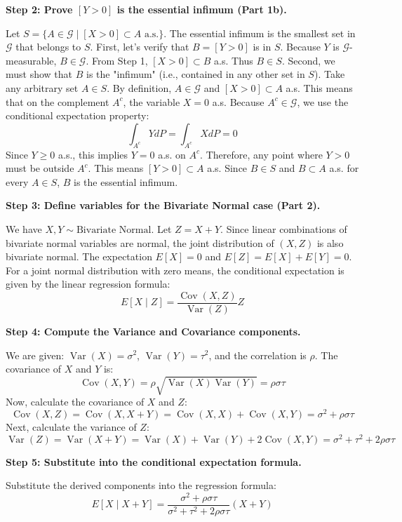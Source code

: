 \begin{solution}
\textbf{Step 2: Prove $[Y > 0]$ is the essential infimum (Part 1b).}

Let $S = \{ A \in \mathcal{G} \mid [X > 0] \subset A \text{ a.s.} \}$. The essential infimum is the smallest set in $\mathcal{G}$ that belongs to $S$.
First, let's verify that $B = [Y > 0]$ is in $S$. Because $Y$ is $\mathcal{G}$-measurable, $B \in \mathcal{G}$. From Step 1, $[X > 0] \subset B$ a.s. Thus $B \in S$.
Second, we must show that $B$ is the "infimum" (i.e., contained in any other set in $S$).
Take any arbitrary set $A \in S$. By definition, $A \in \mathcal{G}$ and $[X > 0] \subset A$ a.s.
This means that on the complement $A^c$, the variable $X = 0$ a.s.
Because $A^c \in \mathcal{G}$, we use the conditional expectation property:
\[ \int_{A^c} Y dP = \int_{A^c} X dP = 0 \]
Since $Y \geq 0$ a.s., this implies $Y = 0$ a.s. on $A^c$.
Therefore, any point where $Y > 0$ must be outside $A^c$. This means $[Y > 0] \subset A$ a.s.
Since $B \in S$ and $B \subset A$ a.s. for every $A \in S$, $B$ is the essential infimum.

\textbf{Step 3: Define variables for the Bivariate Normal case (Part 2).}

We have $X, Y \sim \text{Bivariate Normal}$. Let $Z = X+Y$.
Since linear combinations of bivariate normal variables are normal, the joint distribution of $(X, Z)$ is also bivariate normal.
The expectation $E[X] = 0$ and $E[Z] = E[X] + E[Y] = 0$.
For a joint normal distribution with zero means, the conditional expectation is given by the linear regression formula:
\[ E[X \mid Z] = \frac{\operatorname{Cov}(X, Z)}{\operatorname{Var}(Z)} Z \]

\textbf{Step 4: Compute the Variance and Covariance components.}

We are given: $\operatorname{Var}(X) = \sigma^2$, $\operatorname{Var}(Y) = \tau^2$, and the correlation is $\rho$.
The covariance of $X$ and $Y$ is:
\[ \operatorname{Cov}(X, Y) = \rho \sqrt{\operatorname{Var}(X)\operatorname{Var}(Y)} = \rho \sigma \tau \]
Now, calculate the covariance of $X$ and $Z$:
\[ \operatorname{Cov}(X, Z) = \operatorname{Cov}(X, X+Y) = \operatorname{Cov}(X, X) + \operatorname{Cov}(X, Y) = \sigma^2 + \rho \sigma \tau \]
Next, calculate the variance of $Z$:
\[ \operatorname{Var}(Z) = \operatorname{Var}(X+Y) = \operatorname{Var}(X) + \operatorname{Var}(Y) + 2\operatorname{Cov}(X, Y) = \sigma^2 + \tau^2 + 2\rho\sigma\tau \]

\textbf{Step 5: Substitute into the conditional expectation formula.}

Substitute the derived components into the regression formula:
\[ E[X \mid X+Y] = \frac{\sigma^2 + \rho \sigma \tau}{\sigma^2 + \tau^2 + 2\rho\sigma\tau} (X+Y) \]
\end{solution}

